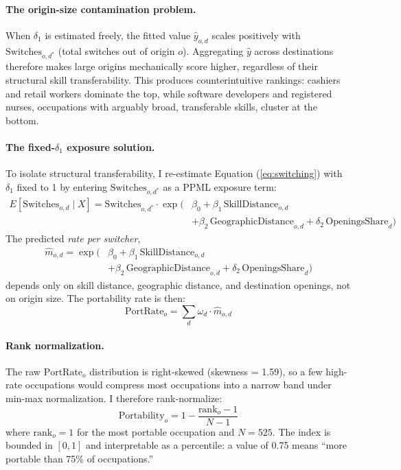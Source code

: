 \documentclass[12pt]{article}
\begin{document}
\paragraph{The origin-size contamination problem.} When $\delta_1$ is estimated freely, the fitted value $\hat{y}_{o,d}$ scales positively with $\text{Switches}_{o,d^*}$ (total switches out of origin $o$). Aggregating $\hat{y}$ across destinations therefore makes large origins mechanically score higher, regardless of their structural skill transferability. This produces counterintuitive rankings: cashiers and retail workers dominate the top, while software developers and registered nurses, occupations with arguably broad, transferable skills, cluster at the bottom.

\paragraph{The fixed-$\delta_1$ exposure solution.} To isolate structural transferability, I re-estimate Equation (\ref{eq:switching}) with $\delta_1$ fixed to 1 by entering $\text{Switches}_{o,d^*}$ as a PPML exposure term:
\begin{equation}
\label{eq:exposure}
\begin{aligned}
E[\text{Switches}_{o,d} \mid X] = \text{Switches}_{o,d^*} \cdot \exp\bigl(&\beta_0 + \beta_1 \, \text{SkillDistance}_{o,d} \\
&+ \beta_2 \, \text{GeographicDistance}_{o,d} + \delta_2 \, \text{OpeningsShare}_d\bigr)
\end{aligned}
\end{equation}
The predicted \emph{rate per switcher},
\begin{equation}
\label{eq:rate}
\begin{aligned}
\hat{m}_{o,d} = \exp\bigl(&\beta_0 + \beta_1 \, \text{SkillDistance}_{o,d} \\
&+ \beta_2 \, \text{GeographicDistance}_{o,d} + \delta_2 \, \text{OpeningsShare}_d\bigr)
\end{aligned}
\end{equation}
depends only on skill distance, geographic distance, and destination openings, not on origin size. The portability rate is then:
\begin{equation}
\label{eq:portrate}
\text{PortRate}_o = \sum_{d} \omega_d \cdot \hat{m}_{o,d}
\end{equation}

\paragraph{Rank normalization.} The raw $\text{PortRate}_o$ distribution is right-skewed (skewness = 1.59), so a few high-rate occupations would compress most occupations into a narrow band under min-max normalization. I therefore rank-normalize:
\begin{equation}
\label{eq:ranknorm}
\text{Portability}_o = 1 - \frac{\text{rank}_o - 1}{N - 1}
\end{equation}
where $\text{rank}_o = 1$ for the most portable occupation and $N = 525$. The index is bounded in $[0,1]$ and interpretable as a percentile: a value of 0.75 means ``more portable than 75\% of occupations.''
\end{document}
